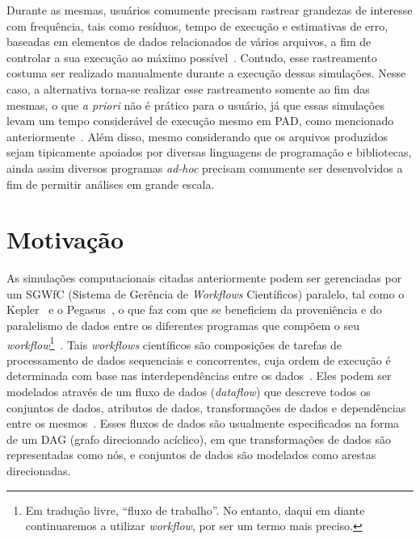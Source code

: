 Durante as mesmas, usuários comumente precisam rastrear grandezas de interesse com frequência, tais como resíduos, tempo de execução e estimativas de erro, baseadas em elementos de dados relacionados de vários arquivos, a fim de controlar a sua execução ao máximo possível~\cite{silva2016situ}. Contudo, esse rastreamento costuma ser realizado manualmente durante a execução dessas simulações. Nesse caso, a alternativa torna-se realizar esse rastreamento somente ao fim das mesmas, o que \textit{a priori} não é prático para o usuário, já que essas simulações levam um tempo considerável de execução mesmo em PAD, como mencionado anteriormente~\cite{silva2017raw}. Além disso, mesmo considerando que os arquivos produzidos sejam tipicamente apoiados por diversas linguagens de programação e bibliotecas, ainda assim diversos programas \textit{ad-hoc} precisam comumente ser desenvolvidos a fim de permitir análises em grande escala.


\section{Motivação}%
\label{sec:motivacao}

As simulações computacionais citadas anteriormente podem ser gerenciadas por um  SGWfC (Sistema de Gerência de \textit{Workflows} Científicos) paralelo, tal como o Kepler~\cite{ludascher2006scientific} e o Pegasus~\cite{deelman2005pegasus}, o que faz com que se beneficiem da proveniência e do paralelismo de dados entre os diferentes programas que compõem o seu \textit{workflow}\footnote{Em tradução livre, ``fluxo de trabalho''. No entanto, daqui em diante continuaremos a utilizar \textit{workflow}, por ser um termo mais preciso.}~\cite{bux2013parallelization}.
Tais \textit{workflows} científicos são composições de tarefas de processamento de dados sequenciais e concorrentes, cuja ordem de execução é determinada com base nas interdependências entre os dados~\cite{bux2013parallelization}. Eles podem ser modelados através de um fluxo de dados (\textit{dataflow}) que descreve todos os conjuntos de dados, atributos de dados, transformações de dados e dependências entre os mesmos~\cite{silva2017raw}. Esses fluxos de dados são usualmente especificados na forma de um  DAG (grafo direcionado acíclico), em que transformações de dados são representadas como nós, e conjuntos de dados são modelados como arestas direcionadas.

